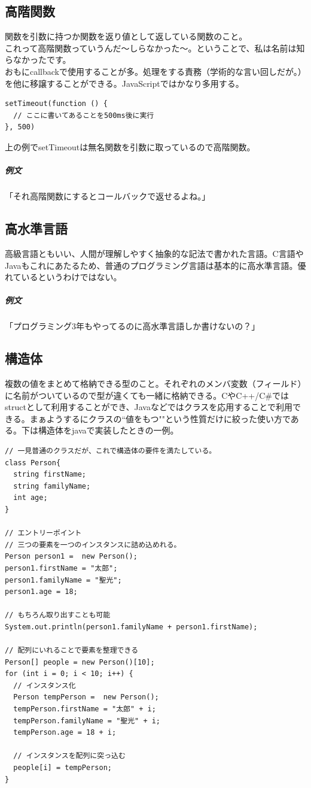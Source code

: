 \documentclass[a4paper]{ltjsreport}
\begin{document}
\subsection{高階関数}
関数を引数に持つか関数を返り値として返している関数のこと。
\\

これって高階関数っていうんだ〜しらなかった〜。ということで、私は名前は知らなかったです。
\\

おもにcallbackで使用することが多。処理をする責務（学術的な言い回しだが。）を他に移譲することができる。JavaScriptではかなり多用する。

\lstset{language=JavaScript}
\begin{lstlisting}
setTimeout(function () {
  // ここに書いてあることを500ms後に実行
}, 500)
\end{lstlisting}

上の例でsetTimeoutは無名関数を引数に取っているので高階関数。
\subparagraph{例文} 「それ高階関数にするとコールバックで返せるよね。」

\subsection{高水準言語}
高級言語ともいい、人間が理解しやすく抽象的な記法で書かれた言語。C言語やJavaもこれにあたるため、普通のプログラミング言語は基本的に高水準言語。優れているというわけではない。

\subparagraph{例文} 「プログラミング3年もやってるのに高水準言語しか書けないの？」

\subsection{構造体}
複数の値をまとめて格納できる型のこと。それぞれのメンバ変数（フィールド）に名前がついているので型が違くても一緒に格納できる。CやC++/C\#ではstructとして利用することができ、Javaなどではクラスを応用することで利用できる。まぁようするにクラスの``値をもつ""という性質だけに絞った使い方である。下は構造体をjavaで実装したときの一例。

\lstset{language=Java}
\begin{lstlisting}
// 一見普通のクラスだが、これで構造体の要件を満たしている。
class Person{
  string firstName;
  string familyName;
  int age;
}

// エントリーポイント
// 三つの要素を一つのインスタンスに詰め込めれる。
Person person1 =  new Person();
person1.firstName = "太郎";
person1.familyName = "聖光";
person1.age = 18;

// もちろん取り出すことも可能
System.out.println(person1.familyName + person1.firstName);

// 配列にいれることで要素を整理できる
Person[] people = new Person()[10];
for (int i = 0; i < 10; i++) {
  // インスタンス化
  Person tempPerson =  new Person();
  tempPerson.firstName = "太郎" + i;
  tempPerson.familyName = "聖光" + i;
  tempPerson.age = 18 + i;

  // インスタンスを配列に突っ込む
  people[i] = tempPerson;
}
\end{lstlisting}
\end{document}
